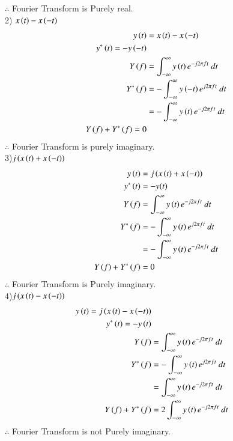 \documentclass[journal,12pt,twocolumn]{IEEEtran}
\theoremstyle{remark}
\begin{document}
$\therefore$ Fourier Transform is Purely real.\\
2) $x\left(t\right) - x\left(-t\right)$\\
\begin{align}
  y\brak{t}&=x\brak{t} - x\brak{-t}\\
  y^*\brak{t}=-y\brak{-t}\\
  Y\brak{f}&=\int_{-\infty}^{\infty} y\brak{t} e^{-j 2\pi f t} \ dt\\
  Y^*\brak{f}&=-\int_{-\infty}^{\infty} y\brak{-t} e^{j 2\pi f t} \ dt\\
  &=-\int_{-\infty}^{\infty} y\brak{t} e^{-j 2\pi f t} \ dt\\
  Y\brak{f}+Y^*\brak{f}=0
\end{align}
$\therefore$ Fourier Transform is purely imaginary.\\
3)$j\left(x\left(t\right) + x\left(-t\right)\right)$
\begin{align}
  y\brak{t}&= j\brak{x\brak{t} + x\brak{-t}}\\
  y^*\brak{t}&=-y(t)\\
  Y\brak{f}&=\int_{-\infty}^{\infty} y\brak{t} e^{-j 2\pi f t} \ dt\\
  Y^*\brak{f}&=-\int_{-\infty}^{\infty} y\brak{t} e^{j 2\pi f t} \ dt\\
  &=-\int_{-\infty}^{\infty} y\brak{t} e^{-j 2\pi f t} \ dt\\
  Y\brak{f}+Y^*\brak{f}&=0
\end{align}
$\therefore$ Fourier Transform is Purely imaginary.\\
4)$j\left(x\left(t\right) - x\left(-t\right)\right)$
\begin{align}
  y\brak{t}=j\brak{x\brak{t} - x\brak{-t}}\\
  y^*\brak{t}=-y\brak{t}\\
  Y\brak{f}&=\int_{-\infty}^{\infty} y\brak{t} e^{-j 2\pi f t} \ dt\\
  Y^*\brak{f}&=-\int_{-\infty}^{\infty} y\brak{t} e^{j 2\pi f t} \ dt\\
  &=\int_{-\infty}^{\infty} y\brak{t} e^{-j 2\pi f t} \ dt\\
  Y\brak{f}+Y^*\brak{f}&=2\int_{-\infty}^{\infty} y\brak{t} e^{-j 2\pi f t} \ dt
  \end{align}
$\therefore$ Fourier Transform is not Purely imaginary.\\
\end{document}
